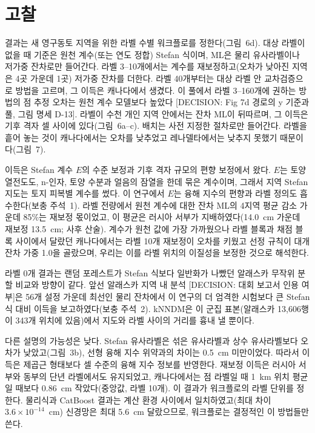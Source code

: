 
\section{고찰}\label{sec:discussion}

결과는 새 영구동토 지역을 위한 라벨 수별 워크플로를 정한다(그림~6d). 대상 라벨이 없을 때 기준은 원천 계수(또는 연도 정합) Stefan 식이며, ML은 물리 유사라벨이나 저가중 잔차로만 들어간다. 라벨 3--10개에서는 계수를 재보정하고(오차가 낮아진 지역은 4곳 가운데 1곳) 저가중 잔차를 더한다. 라벨 40개부터는 대상 라벨 안 교차검증으로 방법을 고르며, 그 이득은 캐나다에서 생겼다. 이 풀에서 라벨 3--160개에 권하는 방법의 점 추정 오차는 원천 계수 모델보다 높았다 [DECISION: Fig 7d 경로의 y 기준과 풀, 그림 명세 D-13]. 라벨이 수천 개인 지역 안에서는 잔차 ML이 뒤따르며, 그 이득은 기후 격자 셀 사이에 있다(그림~6a--c). 배치는 사전 지정한 절차로만 들어간다. 라벨을 흩어 놓는 것이 캐나다에서는 오차를 낮추었고 레나델타에서는 낮추지 못했기 때문이다(그림~7).

이득은 Stefan 계수 $E$의 수준 보정과 기후 격자 규모의 편향 보정에서 왔다. $E$는 토양 열전도도, n-인자, 토양 수분과 얼음의 잠열을 한데 묶은 계수이며\cite{Riseborough2008}, 그래서 지역 Stefan 지도는 토지 피복별 계수를 썼다\cite{Nelson1997,ShiklomanovNelson2002}. 이 연구에서 $E$는 융해 지수의 편향과 라벨 정의도 흡수한다(보충 주석~1). 라벨 전량에서 원천 계수에 대한 잔차 ML의 4지역 평균 감소 가운데 85\%는 재보정 몫이었고, 이 평균은 러시아 서부가 지배하였다(14.0~cm 가운데 재보정 13.5~cm; 사후 산술). 계수가 원천 값에 가장 가까웠으나 라벨 블록과 채점 블록 사이에서 달랐던 캐나다에서는 라벨 10개 재보정이 오차를 키웠고 선정 규칙이 대개 잔차 가중 1.0을 골랐으며, 우리는 이를 라벨 위치의 이질성을 보정한 것으로 해석한다.

라벨 0개 결과는 랜덤 포레스트가 Stefan 식보다 일반화가 나빴던 알래스카 무작위 분할 비교와 방향이 같다\cite{Gautam2025}. 앞선 알래스카 지역 내 분석 [DECISION: 대회 보고서 인용 여부]은 56개 설정 가운데 최선인 물리 잔차에서 이 연구의 더 엄격한 시험보다 큰 Stefan 식 대비 이득을 보고하였다(보충 주석~2). kNNDM\cite{Linnenbrink2024}은 이 군집 표본(알래스카 13,606행이 343개 위치에 있음)에서 지도와 라벨 사이의 거리를 흉내 낼 뿐이다.

다른 설명의 가능성은 낮다. Stefan 유사라벨은 섞은 유사라벨과 상수 유사라벨보다 오차가 낮았고(그림~3b), 선형 융해 지수 위약과의 차이는 0.5~cm 미만이었다. 따라서 이득은 제곱근 형태보다 셀 수준의 융해 지수 정보를 반영한다. 재보정 이득은 러시아 서부와 동부의 단년 라벨에서도 유지되었고, 캐나다에서는 점 라벨일 때 1~km 위치 평균일 때보다 0.86~cm 작았다(중앙값, 라벨 10개). 이 결과가 워크플로의 라벨 단위를 정한다. 물리식과 CatBoost 결과는 계산 환경 사이에서 일치하였고(최대 차이 $3.6\times10^{-14}$~cm) 신경망은 최대 5.6~cm 달랐으므로, 워크플로는 결정적인 이 방법들만 쓴다.

